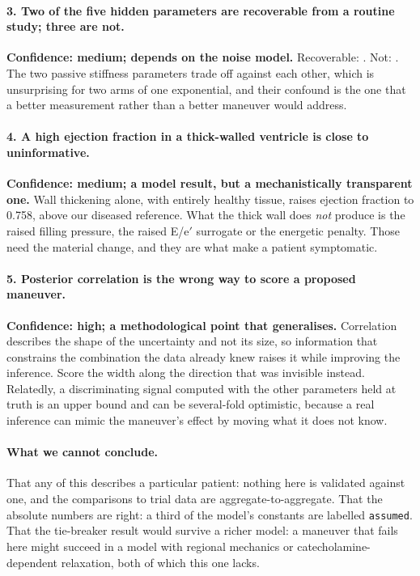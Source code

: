\documentclass[11pt,a4paper]{article}
\newcommand{\claim}[1]{\textcolor{accent}{\textbf{#1}}}
\begin{document}
\paragraph{3. Two of the five hidden parameters are recoverable from a routine study; three
are not.} \claim{Confidence: medium; depends on the noise model.} Recoverable:
\recoverableNames. Not: \unrecoverableNames. The two passive stiffness parameters trade off
against each other, which is unsurprising for two arms of one exponential, and their
confound is the one that a better measurement rather than a better maneuver would address.

\paragraph{4. A high ejection fraction in a thick-walled ventricle is close to
uninformative.} \claim{Confidence: medium; a model result, but a mechanistically transparent
one.} Wall thickening alone, with entirely healthy tissue, raises ejection fraction to 0.758,
above our diseased reference. What the thick wall does \emph{not} produce is the raised
filling pressure, the raised E/e$'$ surrogate or the energetic penalty. Those need the
material change, and they are what make a patient symptomatic.

\paragraph{5. Posterior correlation is the wrong way to score a proposed maneuver.}
\claim{Confidence: high; a methodological point that generalises.} Correlation describes the
shape of the uncertainty and not its size, so information that constrains the combination
the data already knew raises it while improving the inference. Score the width along the
direction that was invisible instead. Relatedly, a discriminating signal computed with the
other parameters held at truth is an upper bound and can be several-fold optimistic, because
a real inference can mimic the maneuver's effect by moving what it does not know.

\paragraph{What we cannot conclude.} That any of this describes a particular patient: nothing
here is validated against one, and the comparisons to trial data are aggregate-to-aggregate.
That the absolute numbers are right: a third of the model's constants are labelled
\texttt{assumed}. That the tie-breaker result would survive a richer model: a maneuver that
fails here might succeed in a model with regional mechanics or catecholamine-dependent
relaxation, both of which this one lacks.
\end{document}
